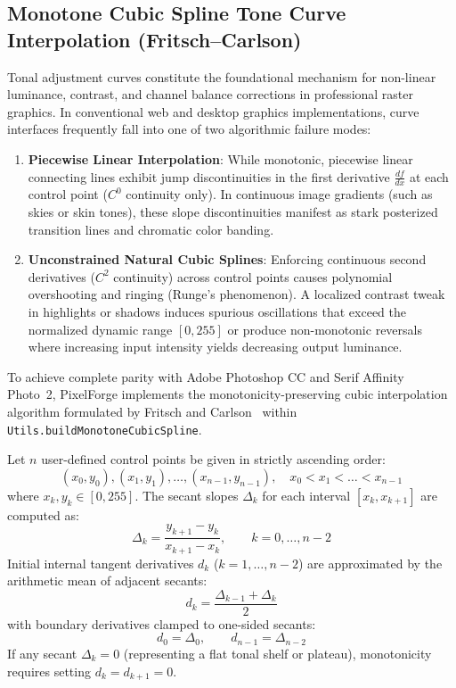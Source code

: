 \documentclass[10pt,journal,compsoc]{IEEEtran}
\begin{document}
\subsection{Monotone Cubic Spline Tone Curve Interpolation (Fritsch--Carlson)}
Tonal adjustment curves constitute the foundational mechanism for non-linear luminance, contrast, and channel balance corrections in professional raster graphics. In conventional web and desktop graphics implementations, curve interfaces frequently fall into one of two algorithmic failure modes:
\begin{enumerate}
    \item \textbf{Piecewise Linear Interpolation}: While monotonic, piecewise linear connecting lines exhibit jump discontinuities in the first derivative $\frac{df}{dx}$ at each control point ($C^0$ continuity only). In continuous image gradients (such as skies or skin tones), these slope discontinuities manifest as stark posterized transition lines and chromatic color banding.
    \item \textbf{Unconstrained Natural Cubic Splines}: Enforcing continuous second derivatives ($C^2$ continuity) across control points causes polynomial overshooting and ringing (Runge's phenomenon). A localized contrast tweak in highlights or shadows induces spurious oscillations that exceed the normalized dynamic range $[0, 255]$ or produce non-monotonic reversals where increasing input intensity yields decreasing output luminance.
\end{enumerate}

To achieve complete parity with Adobe Photoshop CC and Serif Affinity Photo~2, PixelForge implements the monotonicity-preserving cubic interpolation algorithm formulated by Fritsch and Carlson~\cite{fritsch1980} within \texttt{Utils.buildMonotoneCubicSpline}.

Let $n$ user-defined control points be given in strictly ascending order:
\begin{equation}
(x_0, y_0), (x_1, y_1), \dots, (x_{n-1}, y_{n-1}), \quad x_0 < x_1 < \dots < x_{n-1}
\end{equation}
where $x_k, y_k \in [0, 255]$. The secant slopes $\Delta_k$ for each interval $[x_k, x_{k+1}]$ are computed as:
\begin{equation}
\Delta_k = \frac{y_{k+1} - y_k}{x_{k+1} - x_k}, \qquad k = 0, \dots, n-2
\end{equation}
Initial internal tangent derivatives $d_k$ ($k=1, \dots, n-2$) are approximated by the arithmetic mean of adjacent secants:
\begin{equation}
d_k = \frac{\Delta_{k-1} + \Delta_k}{2}
\end{equation}
with boundary derivatives clamped to one-sided secants:
\begin{equation}
d_0 = \Delta_0, \qquad d_{n-1} = \Delta_{n-2}
\end{equation}
If any secant $\Delta_k = 0$ (representing a flat tonal shelf or plateau), monotonicity requires setting $d_k = d_{k+1} = 0$.
\end{document}
